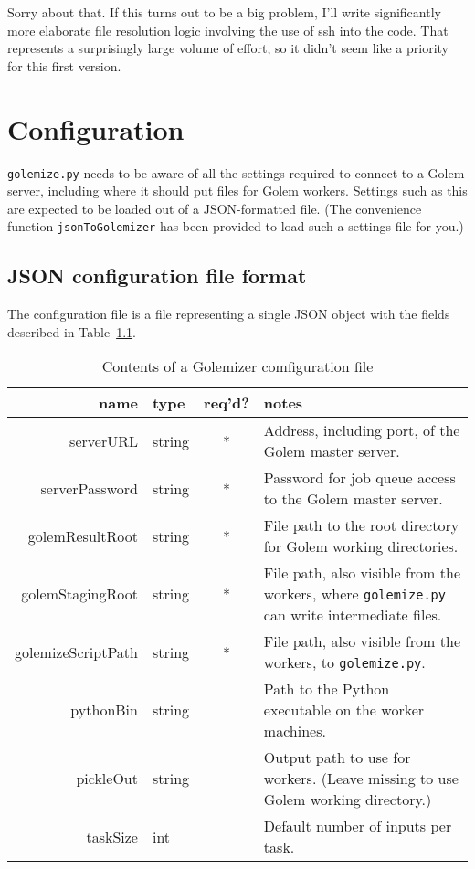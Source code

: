 \documentclass[11pt,ebook,oneside,final]{memoir} %
\begin{document}
Sorry about that. If this turns out to be a big problem, I'll write significantly more elaborate file resolution logic involving the use of ssh into the code. That represents a surprisingly large volume of effort, so it didn't seem like a priority for this first version.

\chapter{Configuration}
\texttt{golemize.py} needs to be aware of all the settings required to connect to a Golem server, including where it should put files for Golem workers. Settings such as this are expected to be loaded out of a JSON-formatted file. (The convenience function \texttt{jsonToGolemizer} has been provided to load such a settings file for you.)
\section{JSON configuration file format}
The configuration file is a file representing a single JSON object with the fields described in Table~\ref{config_table}.
\begin{table}
	\caption{Contents of a Golemizer comfiguration file}
	\begin{tabular}{r|lc||p{2in}}
		name & type & req'd? & notes \\ \hline
		serverURL & string & * & Address, including port, of the Golem master server.\\
		serverPassword & string & * & Password for job queue access to the Golem master server.\\
		golemResultRoot & string & * & File path to the root directory for Golem working directories.\\
		golemStagingRoot & string & * & File path, also visible from the workers, where \texttt{golemize.py} can write intermediate files.\\
		golemizeScriptPath & string & * & File path, also visible from the workers, to \texttt{golemize.py}.\\
		pythonBin & string & & Path to the Python executable on the worker machines.\\
		pickleOut & string & & Output path to use for workers. (Leave missing to use Golem working directory.)\\
		taskSize & int & & Default number of inputs per task. \\ \hline
	\end{tabular}
	\label{config_table}
\end{table}
\end{document}
